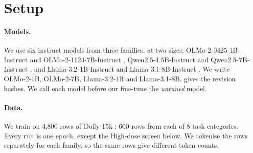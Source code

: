 \documentclass{article}
\begin{document}
\section{Setup}
\label{sec:setup}

\paragraph{Models.} We use six instruct models from three families, at two
sizes: OLMo-2-0425-1B-Instruct and OLMo-2-1124-7B-Instruct
\citep{olmo2024olmo2}, Qwen2.5-1.5B-Instruct and Qwen2.5-7B-Instruct
\citep{qwen2024qwen25}, and Llama-3.2-1B-Instruct and Llama-3.1-8B-Instruct
\citep{grattafiori2024llama}. We write OLMo-2-1B, OLMo-2-7B, Llama-3.2-1B and
Llama-3.1-8B.  gives the revision hashes. We call each model
before our fine-tune the \emph{untuned} model.

\paragraph{Data.} We train on 4,800 rows of Dolly-15k
\citep{conover2023dolly}: 600 rows from each of 8 task categories. Every run is
one epoch, except the High-dose screen below. We tokenise the rows separately
for each family, so the same rows give different token counts.

\end{document}
